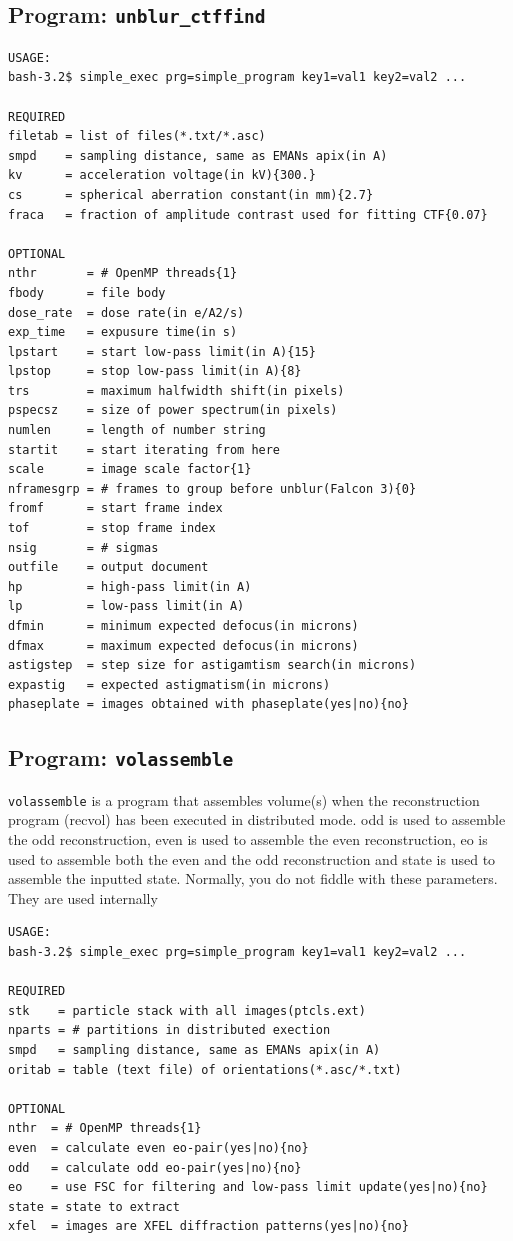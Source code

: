 \documentclass[a4paper,11pt]{article}
\newcommand{\prgname}[1]{\textcolor{NavyBlue}{\texttt{#1}}}
\begin{document}
\subsection{Program: \prgname{unblur\_ctffind}}
\label{unblur_ctffind}
\begin{verbatim}
USAGE:
bash-3.2$ simple_exec prg=simple_program key1=val1 key2=val2 ...

REQUIRED
filetab = list of files(*.txt/*.asc)
smpd    = sampling distance, same as EMANs apix(in A)
kv      = acceleration voltage(in kV){300.}
cs      = spherical aberration constant(in mm){2.7}
fraca   = fraction of amplitude contrast used for fitting CTF{0.07}

OPTIONAL
nthr       = # OpenMP threads{1}
fbody      = file body
dose_rate  = dose rate(in e/A2/s)
exp_time   = expusure time(in s)
lpstart    = start low-pass limit(in A){15}
lpstop     = stop low-pass limit(in A){8}
trs        = maximum halfwidth shift(in pixels)
pspecsz    = size of power spectrum(in pixels)
numlen     = length of number string
startit    = start iterating from here
scale      = image scale factor{1}
nframesgrp = # frames to group before unblur(Falcon 3){0}
fromf      = start frame index
tof        = stop frame index
nsig       = # sigmas
outfile    = output document
hp         = high-pass limit(in A)
lp         = low-pass limit(in A)
dfmin      = minimum expected defocus(in microns)
dfmax      = maximum expected defocus(in microns)
astigstep  = step size for astigamtism search(in microns)
expastig   = expected astigmatism(in microns)
phaseplate = images obtained with phaseplate(yes|no){no}
\end{verbatim}

\subsection{Program: \prgname{volassemble}}
\label{volassemble}
\prgname{volassemble} is a program that assembles volume(s) when the reconstruction program (recvol) has been executed in distributed mode. odd is used to assemble the odd reconstruction, even is used to assemble the even reconstruction, eo is used to assemble both the even and the odd reconstruction and state is used to assemble the inputted state. Normally, you do not fiddle with these parameters. They are used internally

\begin{verbatim}
USAGE:
bash-3.2$ simple_exec prg=simple_program key1=val1 key2=val2 ...

REQUIRED
stk    = particle stack with all images(ptcls.ext)
nparts = # partitions in distributed exection
smpd   = sampling distance, same as EMANs apix(in A)
oritab = table (text file) of orientations(*.asc/*.txt)

OPTIONAL
nthr  = # OpenMP threads{1}
even  = calculate even eo-pair(yes|no){no}
odd   = calculate odd eo-pair(yes|no){no}
eo    = use FSC for filtering and low-pass limit update(yes|no){no}
state = state to extract
xfel  = images are XFEL diffraction patterns(yes|no){no}
\end{verbatim}
\end{document}
